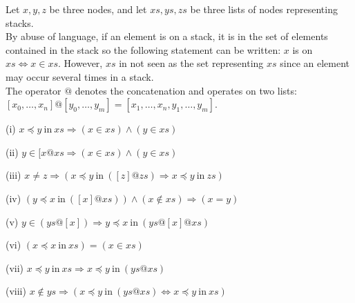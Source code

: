 \documentclass[a4 paper, 12pt]{article}
\theoremstyle{definition}
\begin{document}
Let $x, y, z$ be three nodes, and let $xs, ys, zs$ be three lists of nodes representing stacks.\\
By abuse of language, if an element is on a stack, it is in the set of elements contained in the stack so the following statement can be written: $x$ is on $xs \Longleftrightarrow x \in xs$. However, $xs$ in not seen as the set representing $xs$ since an element may occur several times in a stack.\\
The operator $@$ denotes the concatenation and operates on two lists: $[x_0, \dots, x_n] @ [y_0, \dots, y_m] = [x_1, \dots, x_n, y_1, \dots, y_m]$.\\

\begin{flushleft}
    (i)
$x \preceq y~\text{in}~xs \Longrightarrow (x \in xs)\wedge(y \in xs)$
\end{flushleft}
\begin{flushleft}
    (ii)
$y \in [x@ xs \Longrightarrow (x \in xs)\wedge(y \in xs)$
\end{flushleft}

\begin{flushleft}
    (iii)
    $x \neq z \Longrightarrow (x \preceq y~\text{in}~([z] @ zs) \Longrightarrow x \preceq y ~\text{in}~zs)$
\end{flushleft}

\begin{flushleft}
    (iv)
    $(y \preceq x~\text{in}~([x] @ xs)) \wedge (x \notin xs) \Longrightarrow (x = y)$
\end{flushleft}

\begin{flushleft}
    (v)
    $y \in (ys @ [x]) \Longrightarrow y \preceq x~\text{in}~(ys @ [x] @ xs)$
\end{flushleft} 

\begin{flushleft}
    (vi)
    $(x \preceq x~\text{in}~xs) = (x \in xs)$
\end{flushleft}

\begin{flushleft}
    (vii)
    $x \preceq y~\text{in}~xs \Longrightarrow x \preceq y~\text{in}~(ys @ xs)$
\end{flushleft}

\begin{flushleft}
    (viii)
    $x \notin ys \Longrightarrow (x \preceq y~\text{in}~(ys @ xs) \Longleftrightarrow x \preceq y~\text{in}~xs)$
\end{flushleft}
\end{document}

